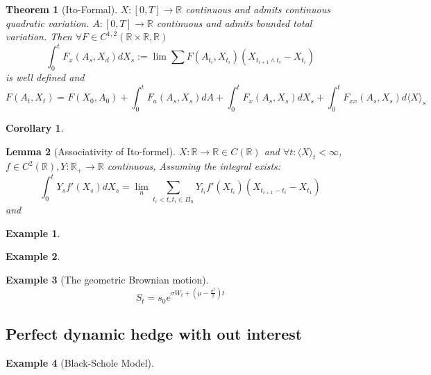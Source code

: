 \documentclass[a4paper,11pt]{book}
\newtheorem{theorem}{Theorem}[section]
\newtheorem{corollary}{Corollary}[theorem]
\newtheorem{lemma}[theorem]{Lemma}
\theoremstyle{definition}
\newtheorem*{example}{Example}
\theoremstyle{remark}
\begin{document}
\begin{theorem}[Ito-Formal]
$X: [0, T] \rightarrow \mathbb{R}$ continuous and admits continuous quadratic variation. $A:[0, T] \rightarrow \mathbb{R}$ continuous and admits bounded total variation. Then $\forall F\in C^{1, 2}(\mathbb{R}\times \mathbb{R}, \mathbb{R})$
\begin{equation*}
	\int_0^t F_x(A_s, X_d) dX_s := \lim \sum F(A_{t_i}, X_{t_i})(X_{t_{i+1} \wedge t_i} - X_{t_i})
\end{equation*}
is well defined and
\begin{equation*}
	F(A_t, X_t) = F(X_0, A_0) + \int_0^t F_a(A_s, X_s) dA + \int_0^t F_x (A_s, X_s) dX_s + \int_0^t F_{xx} (A_s, X_s) d\langle X \rangle_s
\end{equation*}
\end{theorem}

\begin{corollary}
\end{corollary}

\begin{lemma}[Associativity of Ito-formel]
	$X: \mathbb{R} \rightarrow \mathbb{R} \in C(\mathbb{R})$ and $\forall t: \langle X \rangle_t < \infty $, $f \in C^2(\mathbb{R}), Y: \mathbb{R}_+ \rightarrow \mathbb{R}$ continuous, Assuming the integral exists:
	\begin{equation*}
		\int_0^t Y_s f'(X_s)dX_s = \lim_n \sum_{t_i < t, t_i \in \Pi_n} Y_{t_i}f'(X_{t_i}) (X_{t_{i+1} - t_i} - X_{t_1})
	\end{equation*}
	and 
\end{lemma}


\begin{example}
\end{example}

\begin{example}	
\end{example}

\begin{example}[The geometric Brownian motion]
\begin{equation*}
	S_t = s_0 e^{\sigma W_t + (\mu - \frac{\sigma^2}{2})t}
\end{equation*}
\end{example}


\subsection{Perfect dynamic hedge with out interest}
\begin{example}[Black-Schole Model]	
\end{example}
\end{document}
